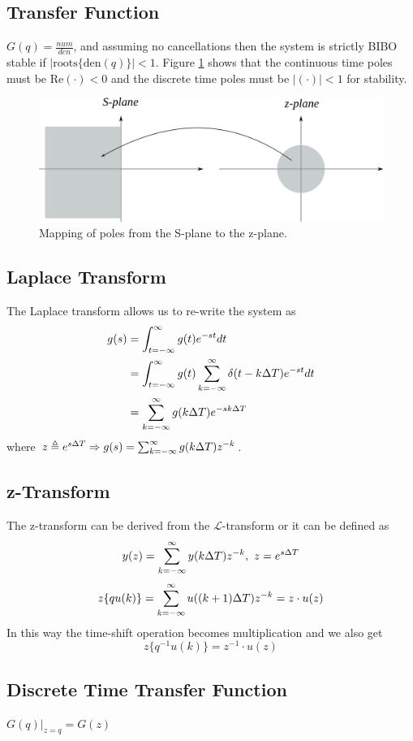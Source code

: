 \documentclass[lecture,12pt,]{pcms-l}
\begin{document}
\subsection{Transfer Function}
$G(q) = \frac{num}{den}$, and assuming no cancellations then the system is strictly BIBO stable if $|\text{roots}\lbrace \text{den}(q)\rbrace|<1$. Figure \ref{fig:03poleMapSZ} shows that the continuous time poles must be $\text{Re}(\cdot) < 0$ and the discrete time poles must be $|(\cdot)| < 1$ for stability.
\begin{figure}[ht!]
	\centering
	\includegraphics[width=.6\textwidth]{images/03poleMapSZ}
	\caption{Mapping of poles from the S-plane to the z-plane.}
	\label{fig:03poleMapSZ}
\end{figure}

\subsection{Laplace Transform}
The Laplace transform allows us to re-write the system as
\begin{align*}
g(s) &= \int_{t=-\infty}^\infty g(t)e^{-st}dt \\
&= \int_{t=-\infty}^\infty g(t)\sum_{k=-\infty}^\infty \delta(t-k\Delta T)e^{-st}dt \\
&= \sum_{k=-\infty}^\infty g(k\Delta T)e^{-sk\Delta T}
\end{align*}
where $z\triangleq e^{s\Delta T} \Rightarrow g(s) = \sum_{k=-\infty}^\infty g(k\Delta T)z^{-k}$.

\subsection{z-Transform}
The z-transform can be derived from the $\mathcal{L}$-transform or it can be defined as
$$y(z) = \sum_{k=-\infty}^\infty y(k\Delta T)z^{-k}, ~z=e^{s\Delta T}$$
$$z\lbrace qu(k)\rbrace = \sum_{k=-\infty}^\infty u((k+1)\Delta T)z^{-k} = z\cdot u(z)$$
In this way the time-shift operation becomes multiplication and we also get
$$z\lbrace q^{-1}u(k)\rbrace = z^{-1}\cdot u(z)$$

\subsection{Discrete Time Transfer Function}
$G(q)|_{z=q} = G(z)$
\end{document}
